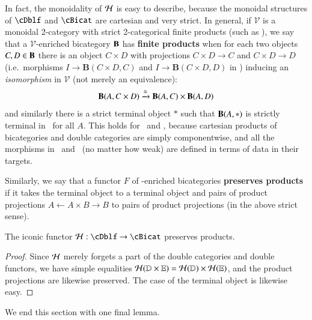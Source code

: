 In fact, the monoidality of $\mathcal{H}$ is easy to describe, because the monoidal structures of $\cDblf$ and $\cBicat$ are cartesian and very strict.
In general, if $\mathcal{V}$ is a monoidal 2-category with strict 2-categorical finite products (such as \Icon), we say that a $\mathcal{V}$-enriched bicategory ${\bf B}$ has \textbf{finite products} when for each two objects $C,D \in {\bf B}$ there is an object $C\times D$ with projections $C\times D\to C$ and $C\times D\to D$ (i.e.\ morphisms $I\to \mathbf{B}(C\times D,C)$ and $I\to \mathbf{B}(C\times D,D)$ in \cV) inducing an \emph{isomorphism} in $\mathcal{V}$ (not merely an equivalence):
%
\begin{align}
{\bf B}(A, C \times D) \xrightarrow{\cong} {\bf B}(A,C) \times {\bf B}(A,D)
\end{align}
and similarly there is a strict terminal object $\ast$ such that $\mathbf{B}(A,\ast)$ is strictly terminal in \cV\ for all $A$.
This holds for \cBicat\ and \cDblf, because cartesian products of bicategories and double categories are simply componentwise, and all the morphisms in \cBicat\ and \cDblf\ (no matter how weak) are defined in terms of data in their targets.

Similarly, we say that a functor $F$ of \cV-enriched bicategories \textbf{preserves products} if it takes the terminal object to a terminal object and pairs of product projections $A \leftarrow A\times B \to B$ to pairs of product projections (in the above strict sense).

\begin{thm}
The iconic functor $\cH: \cDblf \rightarrow \cBicat$ preserves products.
\end{thm}
\begin{proof}
Since $\mathcal{H}$ merely forgets a part of the double categories and double functors, we have simple equalities
$\mathcal{H}(\mathbb{D} \times \mathbb{E}) = \mathcal{H}(\mathbb{D}) \times \mathcal{H}(\mathbb{E})$, and the product projections are likewise preserved.
The case of the terminal object is likewise easy.
\end{proof}

We end this section with one final lemma.

